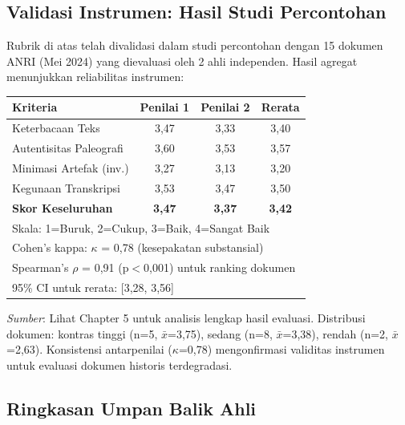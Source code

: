 \documentclass[12pt,a4paper]{article}
\begin{document}
\subsection*{Validasi Instrumen: Hasil Studi Percontohan}

Rubrik di atas telah divalidasi dalam studi percontohan dengan 15 dokumen ANRI (Mei 2024) yang dievaluasi oleh 2 ahli independen. Hasil agregat menunjukkan reliabilitas instrumen:

\begin{table}[h]
\centering
\small
\begin{tabular}{|l|c|c|c|}
\hline
\textbf{Kriteria} & \textbf{Penilai 1} & \textbf{Penilai 2} & \textbf{Rerata} \\
\hline
Keterbacaan Teks & 3,47 & 3,33 & 3,40 \\
Autentisitas Paleografi & 3,60 & 3,53 & 3,57 \\
Minimasi Artefak (inv.) & 3,27 & 3,13 & 3,20 \\
Kegunaan Transkripsi & 3,53 & 3,47 & 3,50 \\
\hline
\textbf{Skor Keseluruhan} & \textbf{3,47} & \textbf{3,37} & \textbf{3,42} \\
\hline
\multicolumn{4}{l}{\footnotesize Skala: 1=Buruk, 2=Cukup, 3=Baik, 4=Sangat Baik} \\
\multicolumn{4}{l}{\footnotesize Cohen's kappa: $\kappa$ = 0,78 (kesepakatan substansial)} \\
\multicolumn{4}{l}{\footnotesize Spearman's $\rho$ = 0,91 (p$<$0,001) untuk ranking dokumen} \\
\multicolumn{4}{l}{\footnotesize 95\% CI untuk rerata: [3,28, 3,56]} \\
\end{tabular}
\end{table}

\textit{Sumber}: Lihat Chapter 5 untuk analisis lengkap hasil evaluasi. Distribusi dokumen: kontras tinggi (n=5, $\bar{x}$=3,75), sedang (n=8, $\bar{x}$=3,38), rendah (n=2, $\bar{x}$=2,63). Konsistensi antarpenilai ($\kappa$=0,78) mengonfirmasi validitas instrumen untuk evaluasi dokumen historis terdegradasi.

\vspace{2em}


\subsection*{Ringkasan Umpan Balik Ahli}
\end{document}
